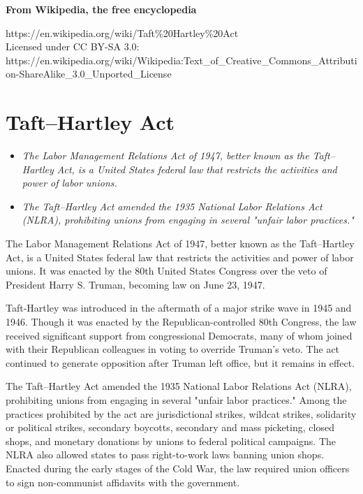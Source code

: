 \textbf{From Wikipedia, the free encyclopedia}

https://en.wikipedia.org/wiki/Taft\%20Hartley\%20Act\\
Licensed under CC BY-SA 3.0:\\
https://en.wikipedia.org/wiki/Wikipedia:Text\_of\_Creative\_Commons\_Attribution-ShareAlike\_3.0\_Unported\_License

\section{Taft--Hartley Act}\label{tafthartley-act}

\begin{itemize}
\item
  \emph{The Labor Management Relations Act of 1947, better known as the
  Taft--Hartley Act, is a United States federal law that restricts the
  activities and power of labor unions.}
\item
  \emph{The Taft--Hartley Act amended the 1935 National Labor Relations
  Act (NLRA), prohibiting unions from engaging in several "unfair labor
  practices."}
\end{itemize}

The Labor Management Relations Act of 1947, better known as the
Taft--Hartley Act, is a United States federal law that restricts the
activities and power of labor unions. It was enacted by the 80th United
States Congress over the veto of President Harry S. Truman, becoming law
on June 23, 1947.

Taft-Hartley was introduced in the aftermath of a major strike wave in
1945 and 1946. Though it was enacted by the Republican-controlled 80th
Congress, the law received significant support from congressional
Democrats, many of whom joined with their Republican colleagues in
voting to override Truman's veto. The act continued to generate
opposition after Truman left office, but it remains in effect.

The Taft--Hartley Act amended the 1935 National Labor Relations Act
(NLRA), prohibiting unions from engaging in several "unfair labor
practices." Among the practices prohibited by the act are jurisdictional
strikes, wildcat strikes, solidarity or political strikes, secondary
boycotts, secondary and mass picketing, closed shops, and monetary
donations by unions to federal political campaigns. The NLRA also
allowed states to pass right-to-work laws banning union shops. Enacted
during the early stages of the Cold War, the law required union officers
to sign non-communist affidavits with the government.

